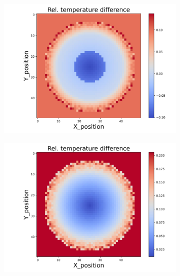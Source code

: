 \begin{figure}[h]
    \begin{minipage}{\textwidth}
        \centering
        \begin{subfigure}{0.325\textwidth}
            \centering
            \includegraphics[width=\textwidth]{figures/raw_data/25/lin_square/T_bias.jpg}
        \end{subfigure}
        \begin{subfigure}{0.325\textwidth}
            \centering
            \includegraphics[width=\textwidth]{figures/raw_data/26/lin_square/T_bias.jpg}
        \end{subfigure}
        \begin{subfigure}{0.325\textwidth}

\end{subfigure}
\end{minipage}
\end{figure}
